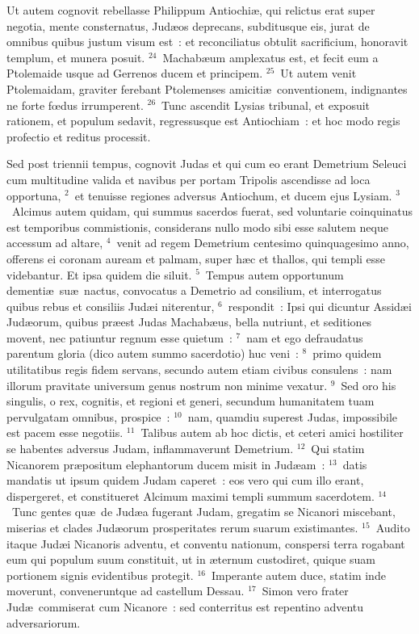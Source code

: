  Ut autem cognovit rebellasse Philippum Antiochi\ae , qui relictus erat super negotia, mente consternatus, Jud\ae os deprecans, subditusque eis, jurat de omnibus quibus justum visum est~: et reconciliatus obtulit sacrificium, honoravit templum, et munera posuit.
${}^{24}$~Machab\ae um amplexatus est, et fecit eum a Ptolemaide usque ad Gerrenos ducem et principem.
${}^{25}$~Ut autem venit Ptolemaidam, graviter ferebant Ptolemenses amiciti\ae\ conventionem, indignantes ne forte fœdus irrumperent.
${}^{26}$~Tunc ascendit Lysias tribunal, et exposuit rationem, et populum sedavit, regressusque est Antiochiam~: et hoc modo regis profectio et reditus processit.

\bchapter
\lettrine[lines=3,image=true,loversize=0.05,lraise=-0.03]{S}{}ed post triennii tempus, cognovit Judas et qui cum eo erant Demetrium Seleuci cum multitudine valida et navibus per portam Tripolis ascendisse ad loca opportuna,
${}^{2}$~et tenuisse regiones adversus Antiochum, et ducem ejus Lysiam.
${}^{3}$~Alcimus autem quidam, qui summus sacerdos fuerat, sed voluntarie coinquinatus est temporibus commistionis, considerans nullo modo sibi esse salutem neque accessum ad altare,
${}^{4}$~venit ad regem Demetrium centesimo quinquagesimo anno, offerens ei coronam auream et palmam, super h\ae c et thallos, qui templi esse videbantur. Et ipsa quidem die siluit.
${}^{5}$~Tempus autem opportunum dementi\ae\ su\ae\ nactus, convocatus a Demetrio ad consilium, et interrogatus quibus rebus et consiliis Jud\ae i niterentur,
${}^{6}$~respondit~: Ipsi qui dicuntur Assid\ae i Jud\ae orum, quibus pr\ae est Judas Machab\ae us, bella nutriunt, et seditiones movent, nec patiuntur regnum esse quietum~:
${}^{7}$~nam et ego defraudatus parentum gloria (dico autem summo sacerdotio) huc veni~:
${}^{8}$~primo quidem utilitatibus regis fidem servans, secundo autem etiam civibus consulens~: nam illorum pravitate universum genus nostrum non minime vexatur.
${}^{9}$~Sed oro his singulis, o rex, cognitis, et regioni et generi, secundum humanitatem tuam pervulgatam omnibus, prospice~:
${}^{10}$~nam, quamdiu superest Judas, impossibile est pacem esse negotiis.
${}^{11}$~Talibus autem ab hoc dictis, et ceteri amici hostiliter se habentes adversus Judam, inflammaverunt Demetrium.
${}^{12}$~Qui statim Nicanorem pr\ae positum elephantorum ducem misit in Jud\ae am~:
${}^{13}$~datis mandatis ut ipsum quidem Judam caperet~: eos vero qui cum illo erant, dispergeret, et constitueret Alcimum maximi templi summum sacerdotem.
${}^{14}$~Tunc gentes qu\ae\ de Jud\ae a fugerant Judam, gregatim se Nicanori miscebant, miserias et clades Jud\ae orum prosperitates rerum suarum existimantes.
${}^{15}$~Audito itaque Jud\ae i Nicanoris adventu, et conventu nationum, conspersi terra rogabant eum qui populum suum constituit, ut in \ae ternum custodiret, quique suam portionem signis evidentibus protegit.
${}^{16}$~Imperante autem duce, statim inde moverunt, conveneruntque ad castellum Dessau.
${}^{17}$~Simon vero frater Jud\ae\ commiserat cum Nicanore~: sed conterritus est repentino adventu adversariorum.


